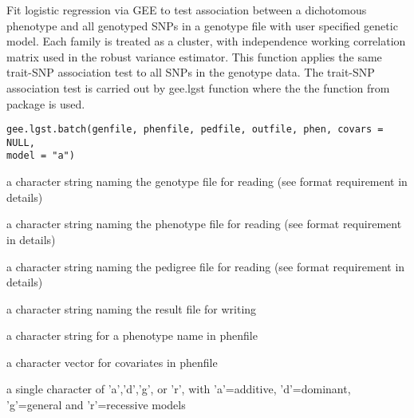 \begin{Description}\relax
Fit logistic regression via GEE to test association between a dichotomous phenotype 
and all genotyped SNPs in a genotype file with user specified genetic model. Each family is treated as 
a cluster, with independence working correlation matrix used in the robust variance estimator.
This function applies the same trait-SNP association test to all SNPs in the genotype data. 
The trait-SNP association test is carried out by gee.lgst function where the 
the  function from package  is used.
\end{Description}
\begin{Usage}
\begin{verbatim}
gee.lgst.batch(genfile, phenfile, pedfile, outfile, phen, covars = NULL, 
model = "a")
\end{verbatim}
\end{Usage}
\begin{Arguments}
\begin{ldescription}
\item[\code{genfile}] a character string naming the genotype file for reading (see format requirement in details) 
\item[\code{phenfile}] a character string naming the phenotype file for reading (see format requirement in details) 
\item[\code{pedfile}] a character string naming the pedigree file for reading (see format requirement in details) 
\item[\code{outfile}] a character string naming the result file for writing 
\item[\code{phen}] a character string for a phenotype name in phenfile 
\item[\code{covars}] a character vector for covariates in phenfile 
\item[\code{model}] a single character of 'a','d','g', or 'r', with 'a'=additive, 'd'=dominant, 'g'=general and 'r'=recessive models 
\end{ldescription}
\end{Arguments}
